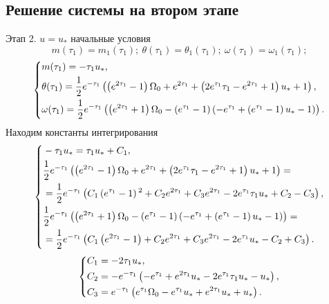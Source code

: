 \documentclass[a4paper,12pt, openany]{book}
\theoremstyle{plain} %
\theoremstyle{definition} %
\theoremstyle{remark} %
\numberwithin{equation}{chapter}
\begin{document}
{\subsection*{Решение системы на втором этапе}
Этап 2. $u=u_*$ начальные условия
\[
    m(\tau_1)=m_1(\tau_1); \ \theta(\tau_1)=\theta_1(\tau_1);\ \omega(\tau_1)=\omega_1(\tau_1);
\]
\[
    \left\{ {\begin{aligned}
                 & m(\tau_1) = -\tau _1 u_*, \hfill                                                            \\
                 & \theta(\tau_1) = \frac{1}{2} e^{-\tau _1} \left(\left(e^{2 \tau _1}-1\right) \Omega _0+e^{2
                \tau _1}+\left(2 e^{\tau _1} \tau _1-e^{2 \tau _1}+1\right) u_*+1\right) , \hfill              \\
                 & \omega(\tau_1) = \frac{1}{2} e^{-\tau _1} \left(\left(e^{2 \tau _1}+1\right) \Omega
                _0-\left(e^{\tau _1}-1\right) \left(-e^{\tau _1}+\left(e^{\tau
                _1}-1\right) u_*-1\right)\right) . \hfill                                                      \\
            \end{aligned}} \right.
\]
Находим константы интегрирования
\[
    \left\{ {\begin{aligned}
                 & -\tau _1 u_* = \tau _1 u_*+C_1, \hfill                                         \\
                 & \frac{1}{2} e^{-\tau _1} \left(\left(e^{2 \tau _1}-1\right) \Omega _0+e^{2
                \tau _1}+\left(2 e^{\tau _1} \tau _1-e^{2 \tau _1}+1\right) u_*+1\right) =        \\
                 & = \frac{1}{2} e^{-\tau _1} \left(C_1 \left(e^{\tau _1}-1\right){}^2+C_2 e^{2
                \tau _1}+C_3 e^{2 \tau _1}-2 e^{\tau _1} \tau _1 u_*+C_2-C_3\right) , \hfill      \\
                 & \frac{1}{2} e^{-\tau _1} \left(\left(e^{2 \tau _1}+1\right) \Omega
                _0-\left(e^{\tau _1}-1\right) \left(-e^{\tau _1}+\left(e^{\tau
                _1}-1\right) u_*-1\right)\right)=                                                 \\
                 & =\frac{1}{2} e^{-\tau _1} \left(C_1 \left(e^{2 \tau _1}-1\right)+C_2 e^{2 \tau
                _1}+C_3 e^{2 \tau _1}-2 e^{\tau _1} u_*-C_2+C_3\right)  . \hfill                  \\
            \end{aligned}} \right.
\]
\[
    \left\{ {\begin{aligned}
                 & C_1 =-2 \tau _1 u_*, \hfill                                                    \\
                 & C_2 = -e^{-\tau _1} \left(-e^{\tau _1}+e^{2 \tau _1} u_*-2 e^{\tau _1} \tau _1
                u_*-u_*\right), \hfill                                                            \\
                 & C_3 = e^{-\tau _1} \left(e^{\tau _1} \Omega _0-e^{\tau _1} u_*+e^{2 \tau _1}
                u_*+u_*\right). \hfill                                                            \\
            \end{aligned}} \right.
\]

}
\end{document}
